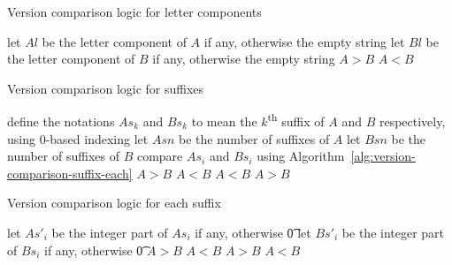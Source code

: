 \begin{algorithm}
\caption{Version comparison logic for letter components} \label{alg:version-comparison-letter}
\begin{algorithmic}[1]
  \STATE let $Al$ be the letter component of $A$ if any, otherwise the empty string
  \STATE let $Bl$ be the letter component of $B$ if any, otherwise the empty string
    \RETURN $A>B$
    \RETURN $A<B$
  \ENDIF
\end{algorithmic}
\end{algorithm}

\begin{algorithm}
\caption{Version comparison logic for suffixes} \label{alg:version-comparison-suffix}
\begin{algorithmic}[1]
  \STATE define the notations $As_k$ and $Bs_k$ to mean the $k$\textsuperscript{th} suffix of $A$ and $B$ respectively, using $0$-based indexing
  \STATE let $Asn$ be the number of suffixes of $A$
  \STATE let $Bsn$ be the number of suffixes of $B$
    \STATE compare $As_i$ and $Bs_i$ using Algorithm~\ref{alg:version-comparison-suffix-each}
  \ENDFOR
      \RETURN $A>B$
    \ELSE
      \RETURN $A<B$
    \ENDIF
      \RETURN $A<B$
    \ELSE
      \RETURN $A>B$
    \ENDIF
  \ENDIF
\end{algorithmic}
\end{algorithm}

\begin{algorithm}
\caption{Version comparison logic for each suffix} \label{alg:version-comparison-suffix-each}
\begin{algorithmic}[1]
    \STATE let $As'_i$ be the integer part of $As_i$ if any, otherwise \t{0}
    \STATE let $Bs'_i$ be the integer part of $Bs_i$ if any, otherwise \t{0}
      \RETURN $A>B$
      \RETURN $A<B$
    \ENDIF
    \RETURN $A>B$
  \ELSE
    \RETURN $A<B$
  \ENDIF
\end{algorithmic}
\end{algorithm}

